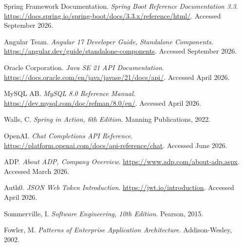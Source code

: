 \documentclass[12pt,a4paper]{report}
\begin{document}
\begin{enumerate}[label={[\arabic*]}]
  \item Spring Framework Documentation.
    \textit{Spring Boot Reference Documentation 3.3}.
    \url{https://docs.spring.io/spring-boot/docs/3.3.x/reference/html/}.
    Accessed September 2026.

  \item Angular Team.
    \textit{Angular 17 Developer Guide, Standalone Components}.
    \url{https://angular.dev/guide/standalone-components}.
    Accessed September 2026.

  \item Oracle Corporation.
    \textit{Java SE 21 API Documentation}.
    \url{https://docs.oracle.com/en/java/javase/21/docs/api/}.
    Accessed April 2026.

  \item MySQL AB.
    \textit{MySQL 8.0 Reference Manual}.
    \url{https://dev.mysql.com/doc/refman/8.0/en/}.
    Accessed April 2026.

  \item Walls, C.
    \textit{Spring in Action, 6th Edition}.
    Manning Publications, 2022.

  \item OpenAI.
    \textit{Chat Completions API Reference}.
    \url{https://platform.openai.com/docs/api-reference/chat}.
    Accessed June 2026.

  \item ADP.
    \textit{About ADP, Company Overview}.
    \url{https://www.adp.com/about-adp.aspx}.
    Accessed March 2026.

  \item Auth0.
    \textit{JSON Web Token Introduction}.
    \url{https://jwt.io/introduction}.
    Accessed April 2026.

  \item Sommerville, I.
    \textit{Software Engineering, 10th Edition}.
    Pearson, 2015.

  \item Fowler, M.
    \textit{Patterns of Enterprise Application Architecture}.
    Addison-Wesley, 2002.
\end{enumerate}
\end{document}
